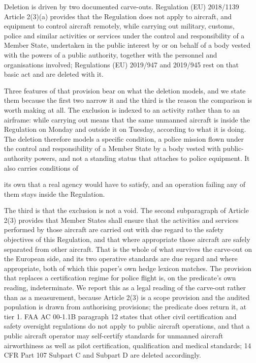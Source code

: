 Deletion is driven by two documented carve-outs. Regulation (EU) 2018/1139 Article 2(3)(a) provides that the Regulation does not apply to aircraft, and equipment to control aircraft remotely, while carrying out military, customs, police and similar activities or services under the control and responsibility of a Member State, undertaken in the public interest by or on behalf of a body vested with the powers of a public authority, together with the personnel and organisations involved; Regulations (EU) 2019/947 and 2019/945 rest on that basic act and are deleted with it.

Three features of that provision bear on what the deletion models, and we state them because the first two narrow it and the third is the reason the comparison is worth making at all. The exclusion is indexed to an activity rather than to an airframe: while carrying out means that the same unmanned aircraft is inside the Regulation on Monday and outside it on Tuesday, according to what it is doing. The deletion therefore models a specific condition, a police mission flown under the control and responsibility of a Member State by a body vested with public-authority powers, and not a standing status that attaches to police equipment. It also carries conditions of

its own that a real agency would have to satisfy, and an operation failing any of them stays inside the Regulation.

The third is that the exclusion is not a void. The second subparagraph of Article 2(3) provides that Member States shall ensure that the activities and services performed by those aircraft are carried out with due regard to the safety objectives of this Regulation, and that where appropriate those aircraft are safely separated from other aircraft. That is the whole of what survives the carve-out on the European side, and its two operative standards are due regard and where appropriate, both of which this paper's own hedge lexicon matches. The provision that replaces a certification regime for police flight is, on the predicate's own reading, indeterminate. We report this as a legal reading of the carve-out rather than as a measurement, because Article 2(3) is a scope provision and the audited population is drawn from authorising provisions; the predicate does return it, at tier 1. FAA AC 00-1.1B paragraph 12 states that other civil certification and safety oversight regulations do not apply to public aircraft operations, and that a public aircraft operator may self-certify standards for unmanned aircraft airworthiness as well as pilot certification, qualification and medical standards; 14 CFR Part 107 Subpart C and Subpart D are deleted accordingly.

